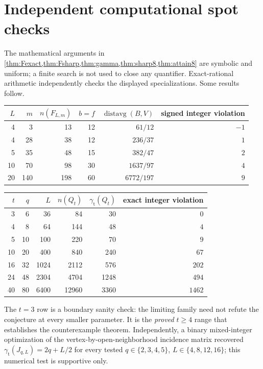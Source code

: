 \documentclass[11pt,a4paper]{article}
\theoremstyle{definition}
\theoremstyle{remark}
\newcommand{\avg}{\operatorname{distavg}}
\newcommand{\gam}{\gamma_{\mathrm t}}
\begin{document}
\section{Independent computational spot checks}
The mathematical arguments in \cref{thm:Fexact,thm:Fsharp,thm:gamma,thm:sharp8,thm:attain8} are symbolic and uniform; a finite search is not used to close any quantifier. Exact-rational arithmetic independently checks the displayed specializations. Some results follow.
\begin{center}
\small
\begin{tabular}{rrrrrr}
\toprule
$L$ & $m$ & $n(F_{L,m})$ & $b=f$ & $\avg(B,V)$ & signed integer violation \\
\midrule
4 & 3 & 13 & 12 & $61/12$ & $-1$\\
4 & 28 & 38 & 12 & $236/37$ & $1$\\
5 & 35 & 48 & 15 & $382/47$ & $2$\\
10 & 70 & 98 & 30 & $1637/97$ & $4$\\
20 & 140 & 198 & 60 & $6772/197$ & $9$\\
\bottomrule
\end{tabular}
\end{center}
\begin{center}
\small
\begin{tabular}{rrrrrr}
\toprule
$t$ & $q$ & $L$ & $n(Q_t)$ & $\gam(Q_t)$ & exact integer violation \\
\midrule
3 & 6 & 36 & 84 & 30 & $0$\\
4 & 8 & 64 & 144 & 48 & $4$\\
5 & 10 & 100 & 220 & 70 & $9$\\
10 & 20 & 400 & 840 & 240 & $67$\\
16 & 32 & 1024 & 2112 & 576 & $202$\\
24 & 48 & 2304 & 4704 & 1248 & $494$\\
40 & 80 & 6400 & 12960 & 3360 & $1462$\\
\bottomrule
\end{tabular}
\end{center}
The $t=3$ row is a boundary sanity check: the limiting family need not refute the conjecture at every smaller parameter. It is the \emph{proved} $t\ge4$ range that establishes the counterexample theorem. Independently, a binary mixed-integer optimization of the vertex-by-open-neighborhood incidence matrix recovered $\gam(J_{q,L})=2q+L/2$ for every tested $q\in\{2,3,4,5\}$, $L\in\{4,8,12,16\}$; this numerical test is supportive only.
\end{document}
